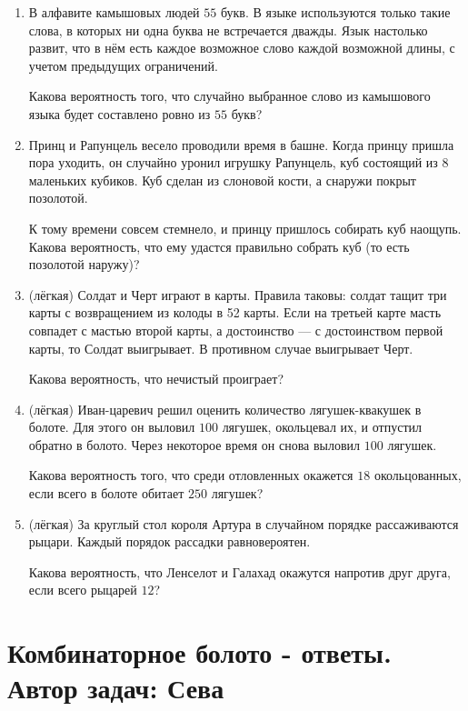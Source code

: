 \documentclass[a4paper,12pt]{article}
\begin{document}
\begin{enumerate} %
\item %
В алфавите камышовых людей $55$ букв. В языке используются только такие слова, в которых ни одна буква не встречается дважды. Язык настолько развит, что в нём есть каждое возможное слово каждой возможной длины, с учетом предыдущих ограничений.

Какова вероятность того, что случайно выбранное слово из камышового языка будет составлено ровно из $55$ букв?
\item
Принц и Рапунцель весело проводили время в башне. Когда принцу пришла пора уходить, он случайно уронил игрушку Рапунцель, куб состоящий из 8 маленьких кубиков. Куб сделан из слоновой кости, а снаружи покрыт позолотой.

К тому времени совсем стемнело, и принцу пришлось собирать куб наощупь. Какова вероятность, что ему удастся правильно собрать куб (то есть позолотой наружу)?
\item (лёгкая)
Солдат и Черт играют в карты. Правила таковы: солдат тащит три карты с возвращением из колоды в 52 карты. Если на третьей карте масть совпадет с мастью второй карты, а достоинство — с достоинством первой карты, то Солдат выигрывает. В противном случае выигрывает Черт.

Какова вероятность, что нечистый проиграет?
\item (лёгкая)
Иван-царевич решил оценить количество лягушек-квакушек в болоте. Для этого он выловил $100$ лягушек, окольцевал их, и отпустил обратно в болото. Через некоторое время он снова выловил $100$ лягушек.

Какова вероятность того, что среди отловленных окажется $18$ окольцованных, если всего в болоте обитает $250$ лягушек?
\item (лёгкая)
За круглый стол короля Артура в случайном порядке рассаживаются рыцари. Каждый порядок рассадки равновероятен.

Какова вероятность, что Ленселот и Галахад окажутся напротив друг друга, если всего рыцарей $12$?
\end{enumerate}
\newpage
\section{Комбинаторное болото - ответы. Автор задач: Сева}
\end{document}
